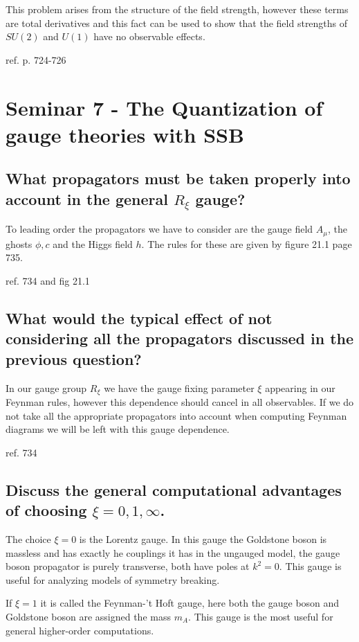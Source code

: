 \documentclass[paper=a4, fontsize=11pt]{scrartcl} %
\numberwithin{equation}{section} %
\numberwithin{figure}{section} %
\numberwithin{table}{section} %
\begin{document}
This problem arises from the structure of the field strength, however these terms are total derivatives and this fact can be used to show that the field strengths of $SU(2)$ and $U(1)$ have no observable effects. 

ref. p. 724-726

\section*{Seminar 7 - The Quantization of gauge theories with SSB}

\subsection*{What propagators must be taken properly into account in the general $R_{\xi}$ gauge?}

To leading order the propagators we have to consider are the gauge field $A_{\mu}$, the ghosts $\phi, c$ and the Higgs field $h$. The rules for these are given by figure 21.1 page 735. 

ref. 734 and fig 21.1

\subsection*{What would the typical effect of not considering all the propagators discussed in the previous question?}

In our gauge group $R_{\xi}$ we have the gauge fixing parameter $\xi$ appearing in our Feynman rules, however this dependence should cancel in all observables. If we do not take all the appropriate propagators into account when computing Feynman diagrams we will be left with this gauge dependence. 

ref. 734

\subsection*{Discuss the general computational advantages of choosing $\xi = 0 , 1, \infty$.}

The choice $\xi = 0$ is the Lorentz gauge. In this gauge the Goldstone boson is massless and has exactly he couplings it has in the ungauged model, the gauge boson propagator is purely transverse, both have poles at $k^2 = 0 $. This gauge is useful for analyzing models of symmetry breaking. 

If $\xi = 1$ it is called the Feynman-'t Hoft gauge, here both the gauge boson and Goldstone boson are assigned the mass $m_A$. This gauge is the most useful for general higher-order computations. 
\end{document}
